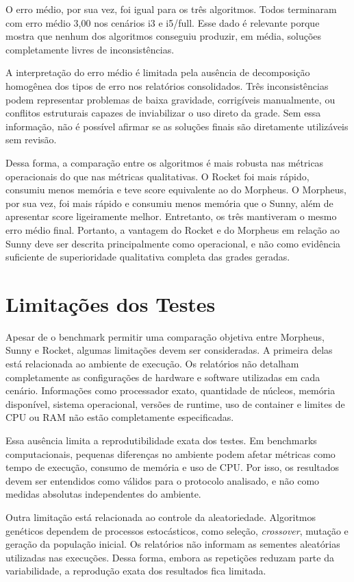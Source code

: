 O erro médio, por sua vez, foi igual para os três algoritmos. Todos terminaram com erro médio 3,00 nos cenários i3 e i5/full. Esse dado é relevante porque mostra que nenhum dos algoritmos conseguiu produzir, em média, soluções completamente livres de inconsistências.

A interpretação do erro médio é limitada pela ausência de decomposição homogênea dos tipos de erro nos relatórios consolidados. Três inconsistências podem representar problemas de baixa gravidade, corrigíveis manualmente, ou conflitos estruturais capazes de inviabilizar o uso direto da grade. Sem essa informação, não é possível afirmar se as soluções finais são diretamente utilizáveis sem revisão.

Dessa forma, a comparação entre os algoritmos é mais robusta nas métricas operacionais do que nas métricas qualitativas. O Rocket foi mais rápido, consumiu menos memória e teve score equivalente ao do Morpheus. O Morpheus, por sua vez, foi mais rápido e consumiu menos memória que o Sunny, além de apresentar score ligeiramente melhor. Entretanto, os três mantiveram o mesmo erro médio final. Portanto, a vantagem do Rocket e do Morpheus em relação ao Sunny deve ser descrita principalmente como operacional, e não como evidência suficiente de superioridade qualitativa completa das grades geradas.

\section{Limitações dos Testes}
\label{sec:limitacoes-testes}

Apesar de o benchmark permitir uma comparação objetiva entre Morpheus, Sunny e Rocket, algumas limitações devem ser consideradas. A primeira delas está relacionada ao ambiente de execução. Os relatórios não detalham completamente as configurações de hardware e software utilizadas em cada cenário. Informações como processador exato, quantidade de núcleos, memória disponível, sistema operacional, versões de runtime, uso de container e limites de CPU ou RAM não estão completamente especificadas.

Essa ausência limita a reprodutibilidade exata dos testes. Em benchmarks computacionais, pequenas diferenças no ambiente podem afetar métricas como tempo de execução, consumo de memória e uso de CPU. Por isso, os resultados devem ser entendidos como válidos para o protocolo analisado, e não como medidas absolutas independentes do ambiente.

Outra limitação está relacionada ao controle da aleatoriedade. Algoritmos genéticos dependem de processos estocásticos, como seleção, \textit{crossover}, mutação e geração da população inicial. Os relatórios não informam as sementes aleatórias utilizadas nas execuções. Dessa forma, embora as repetições reduzam parte da variabilidade, a reprodução exata dos resultados fica limitada.

